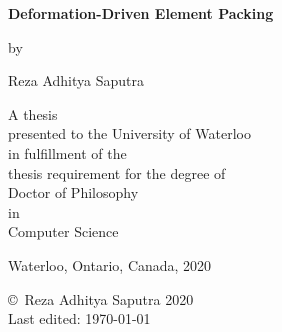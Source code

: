 \pagestyle{empty}

\begin{titlepage}
        \begin{center}
        \vspace*{1.0cm}

        \Huge
        {\bf Deformation-Driven Element Packing }

        \vspace*{1.0cm}

        \normalsize
        by \\

        \vspace*{1.0cm}

        \Large
        Reza Adhitya Saputra \\

        \vspace*{3.0cm}

        \normalsize
        A thesis \\
        presented to the University of Waterloo \\ 
        in fulfillment of the \\
        thesis requirement for the degree of \\
        Doctor of Philosophy \\
        in \\
        Computer Science \\

        \vspace*{2.0cm}

        Waterloo, Ontario, Canada, 2020 \\

        \vspace*{1.0cm}

        \copyright\ Reza Adhitya Saputra 2020 \\


        
        Last edited: \today \;\; \currenttime

        \end{center}



\end{titlepage}

